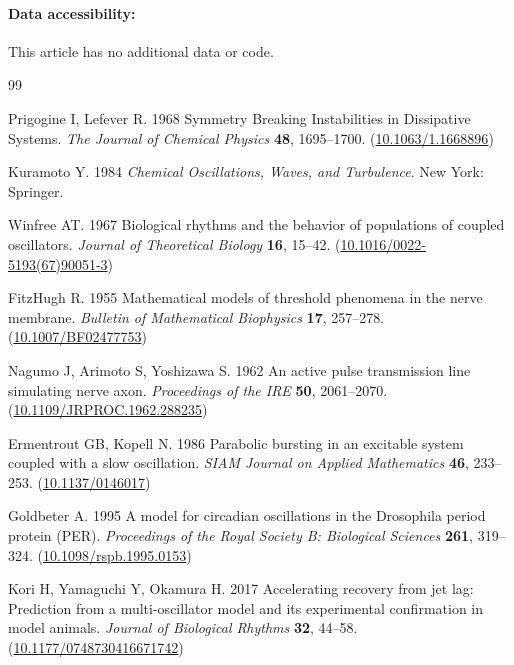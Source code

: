 \documentclass[
amsmath,amssymb,
]{revtex4-2}
\begin{document}
\paragraph*{Data accessibility:}
This article has no additional data or code.
% 
\begin{thebibliography}{99}

Prigogine I, Lefever R. 1968  Symmetry Breaking Instabilities in Dissipative Systems. {\em The Journal of Chemical Physics} \textbf{48}, 1695--1700.
(\href{http://dx.doi.org/10.1063/1.1668896}{10.1063/1.1668896})

Kuramoto Y. 1984 {\em Chemical Oscillations, Waves, and Turbulence}.
New York: Springer.

Winfree AT. 1967  Biological rhythms and the behavior of populations of coupled oscillators. {\em Journal of Theoretical Biology} \textbf{16}, 15--42.
(\href{http://dx.doi.org/10.1016/0022-5193(67)90051-3}{10.1016/0022-5193(67)90051-3})

FitzHugh R. 1955  Mathematical models of threshold phenomena in the nerve membrane. {\em Bulletin of Mathematical Biophysics} \textbf{17}, 257--278.
(\href{http://dx.doi.org/10.1007/BF02477753}{10.1007/BF02477753})

Nagumo J, Arimoto S, Yoshizawa S. 1962  An active pulse transmission line simulating nerve axon. {\em Proceedings of the IRE} \textbf{50}, 2061--2070.
(\href{http://dx.doi.org/10.1109/JRPROC.1962.288235}{10.1109/JRPROC.1962.288235})

Ermentrout GB, Kopell N. 1986  Parabolic bursting in an excitable system coupled with a slow oscillation. {\em SIAM Journal on Applied Mathematics} \textbf{46}, 233--253.
(\href{http://dx.doi.org/10.1137/0146017}{10.1137/0146017})

Goldbeter A. 1995  A model for circadian oscillations in the Drosophila period protein (PER). {\em Proceedings of the Royal Society B: Biological Sciences} \textbf{261}, 319--324.
(\href{http://dx.doi.org/10.1098/rspb.1995.0153}{10.1098/rspb.1995.0153})

Kori H, Yamaguchi Y, Okamura H. 2017  Accelerating recovery from jet lag: Prediction from a multi-oscillator model and its experimental confirmation in model animals. {\em Journal of Biological Rhythms} \textbf{32}, 44--58.
(\href{http://dx.doi.org/10.1177/0748730416671742}{10.1177/0748730416671742})


\end{thebibliography}
\end{document}

